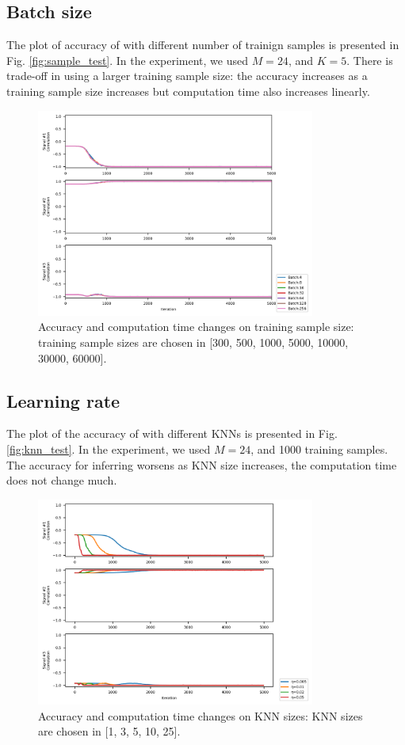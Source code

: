 \documentclass[conference]{IEEEtran}
\begin{document}
\subsection{Batch size}

The plot of accuracy of with different number of trainign samples is presented in Fig. \ref{fig:sample_test}.
In the experiment, we used $M=24$, and $K=5$.
There is trade-off in using a larger training sample size: the accuracy increases as a training sample size increases but computation time also increases linearly.

\begin{figure}[!t]
	\centering
	\includegraphics[width=3.6in]{source3/batch_test.png}	
	\caption{Accuracy and computation time changes on training sample size: training sample sizes are chosen in [300, 500, 1000, 5000, 10000, 30000, 60000].}
	\label{fig:batch_test}
\end{figure}


\subsection{Learning rate}

The plot of the accuracy of with different KNNs is presented in Fig. \ref{fig:knn_test}.
In the experiment, we used $M=24$, and 1000 training samples.
The accuracy for inferring worsens as KNN size increases, the computation time does not change much.

\begin{figure}[!t]
	\centering
	\includegraphics[width=3.6in]{source3/eta_test.png}	
	\caption{Accuracy and computation time changes on KNN sizes: KNN sizes are chosen in [1, 3, 5, 10, 25].}
	\label{fig:eta_test}
\end{figure}
\end{document}
